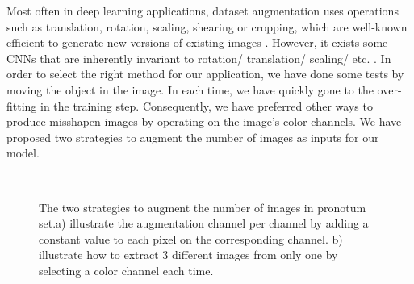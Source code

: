 \documentclass[review]{elsarticle}
\begin{document}

Most often in deep learning applications, dataset augmentation uses operations such as translation, rotation, scaling, shearing or cropping, which are well-known efficient to generate new versions of existing images \cite{krizhevsky2012imagenet, shorten2019survey}. However, it exists some CNNs that are inherently invariant to rotation/ translation/ scaling/ etc. \cite{shorten2019survey}. In order to select the right method for our application, we have done some tests by moving the object in the image. In each time, we have quickly gone to the over-fitting in the training step. Consequently, we have preferred other ways to produce misshapen images by operating on the image's color channels. We have proposed two strategies to augment the number of images as inputs for our model. %

\begin{figure}[h!]
    \centering
    ~~
    \caption{The two strategies to augment the number of images in
      pronotum set.a) illustrate the augmentation channel per channel
      by adding a constant value to each pixel on the corresponding
      channel. b) illustrate how to extract 3 different images from
      only one by selecting a color channel each time.}
    \label{figdataauge}
\end{figure}
\end{document}
